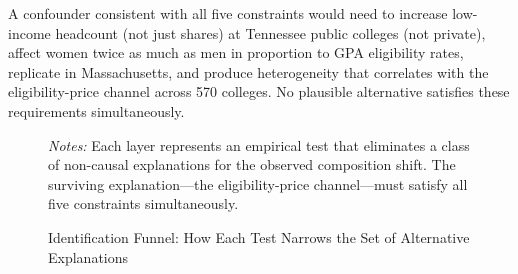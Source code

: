 A confounder consistent with all five constraints would need to
increase low-income headcount (not just shares) at Tennessee public
colleges (not private), affect women twice as much as men in
proportion to GPA eligibility rates, replicate in Massachusetts, and
produce heterogeneity that correlates with the eligibility-price
channel across 570 colleges. No plausible alternative satisfies these
requirements simultaneously.

\begin{figure}[H]
  \centering
  \resizebox{0.95\textwidth}{!}{%
  }
  \caption{Identification Funnel: How Each Test Narrows the Set of
    Alternative Explanations}
  \label{fig:identification_funnel}
  \vspace{1mm}
  \begin{minipage}{0.95\textwidth}
    \footnotesize
    \textit{Notes:} Each layer represents an empirical test that
    eliminates a class of non-causal explanations for the observed
    composition shift. The surviving explanation---the
    eligibility-price channel---must satisfy all five constraints
    simultaneously.
  \end{minipage}
\end{figure}
